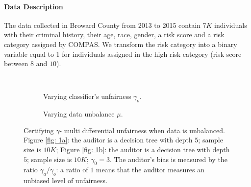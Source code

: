 \documentclass{article}
\begin{document}
\paragraph{Data Description}
The data collected in Broward County from 2013 to 2015  contain $7K$ individuals with their criminal history, their age, race, gender, a risk score and a risk category assigned by COMPAS. We transform the risk category into a binary variable equal to $1$ for individuals assigned in the high risk category (risk score between $8$ and $10$).

 

\


\begin{figure}[h!]
\begin{subfigure} {.475\linewidth}
\centering
{}
\caption{Varying classifier's unfairness $\gamma_{o}$.}
\label{fig: 2a}
\end{subfigure}
 \hfill%
\begin{subfigure} {.475\linewidth}
\centering
{}
\caption{Varying data unbalance $\mu$.}
\label{fig: 2b}
\end{subfigure}
\caption{Certifying $\gamma$- multi differential unfairness when data is unbalanced. Figure \ref{fig: 1a}: the auditor is a decision tree with depth $5$; sample size is $10K$; Figure \ref{fig: 1b}: the auditor is a decision tree with depth $5$; sample size is $10K$; $\gamma_{0}=3$. The auditor's bias is measured by the ratio $\gamma_{a}/\gamma_{o}$: a ratio of $1$ means that the auditor measures an unbiased level of unfairness.} 
\end{figure}
\end{document}

